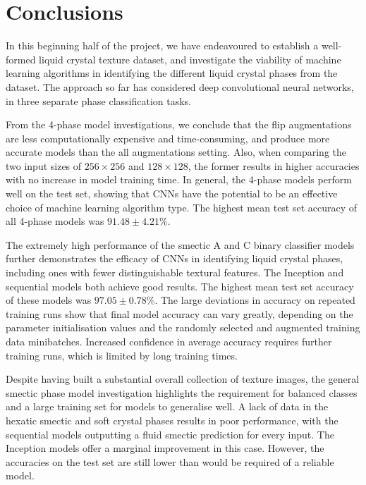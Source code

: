 \documentclass[12pt]{article}
\begin{document}
\section{Conclusions}
In this beginning half of the project, we have endeavoured to establish a well-formed liquid crystal texture dataset, and investigate the viability of machine learning algorithms in identifying the different liquid crystal phases from the dataset. The approach so far has considered deep convolutional neural networks, in three separate phase classification tasks. 

From the 4-phase model investigations, we conclude that the flip augmentations are less computationally expensive and time-consuming, and produce more accurate models than the all augmentations setting. Also, when comparing the two input sizes of $256 \times 256$ and $128 \times 128$, the former results in higher accuracies with no increase in model training time. In general, the 4-phase models perform well on the test set, showing that CNNs have the potential to be an effective choice of machine learning algorithm type. The highest mean test set accuracy of all 4-phase models was $91.48\pm4.21$\%.

The extremely high performance of the smectic A and C binary classifier models further demonstrates the efficacy of CNNs in identifying liquid crystal phases, including ones with fewer distinguishable textural features. The Inception and sequential models both achieve good results. The highest mean test set accuracy of these models was $97.05\pm0.78$\%. The large deviations in accuracy on repeated training runs show that final model accuracy can vary greatly, depending on the parameter initialisation values and the randomly selected and augmented training data minibatches. Increased confidence in average accuracy requires further training runs, which is limited by long training times.

Despite having built a substantial overall collection of texture images, the general smectic phase model investigation highlights the requirement for balanced classes and a large training set for models to generalise well. A lack of data in the hexatic smectic and soft crystal phases results in poor performance, with the sequential models outputting a fluid smectic prediction for every input. The Inception models offer a marginal improvement in this case. However, the accuracies on the test set are still lower than would be required of a reliable model. 
\end{document}
